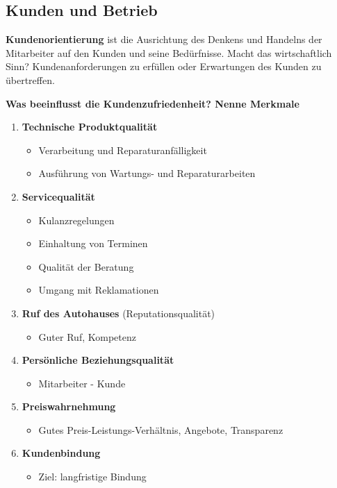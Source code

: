 \newpage

\subsection{Kunden und Betrieb}\label{kunden-und-betrieb}

\textbf{Kundenorientierung} ist die Ausrichtung des Denkens und Handelns
der Mitarbeiter auf den Kunden und seine Bedürfnisse. Macht das
wirtschaftlich Sinn? Kundenanforderungen zu erfüllen oder Erwartungen
des Kunden zu übertreffen.

\textbf{Was beeinflusst die Kundenzufriedenheit? Nenne Merkmale}

\begin{enumerate}
\item
  \textbf{Technische Produktqualität}

  \begin{itemize}
  \item
    Verarbeitung und Reparaturanfälligkeit
  \item
    Ausführung von Wartungs- und Reparaturarbeiten
  \end{itemize}
\item
  \textbf{Servicequalität}

  \begin{itemize}
  \item
    Kulanzregelungen
  \item
    Einhaltung von Terminen
  \item
    Qualität der Beratung
  \item
    Umgang mit Reklamationen
  \end{itemize}
\item
  \textbf{Ruf des Autohauses} (Reputationsqualität)

  \begin{itemize}
  \item
    Guter Ruf, Kompetenz
  \end{itemize}
\item
  \textbf{Persönliche Beziehungsqualität}

  \begin{itemize}
  \item
    Mitarbeiter - Kunde
  \end{itemize}
\item
  \textbf{Preiswahrnehmung}

  \begin{itemize}
  \item
    Gutes Preis-Leistungs-Verhältnis, Angebote, Transparenz
  \end{itemize}
\item
  \textbf{Kundenbindung}

  \begin{itemize}
  \item
    Ziel: langfristige Bindung
  \end{itemize}
\end{enumerate}

